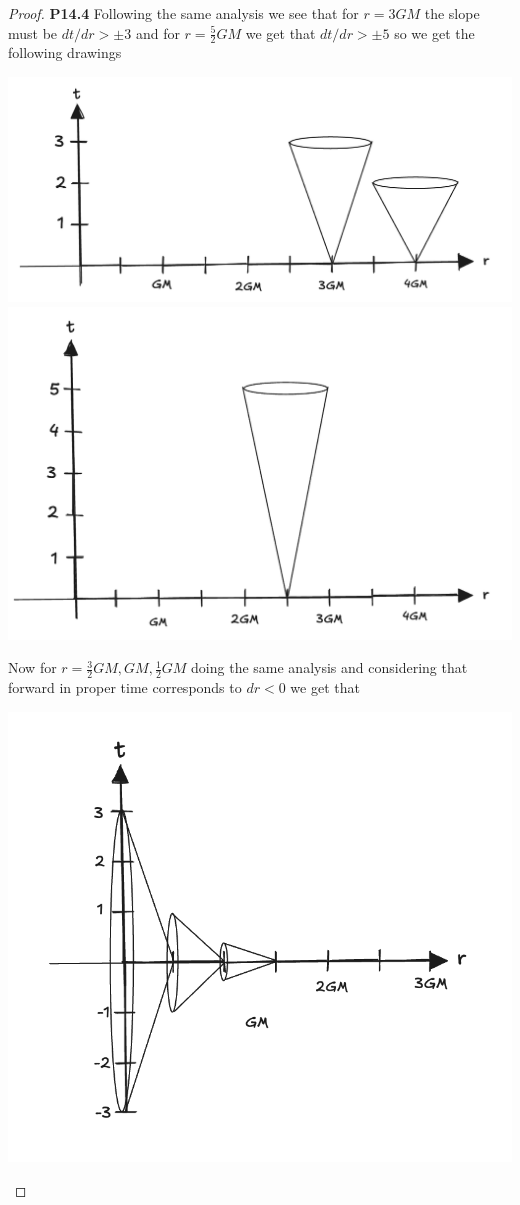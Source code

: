\documentclass[11pt]{article}
\theoremstyle{definition}
\begin{document}
\cleardoublepage
\begin{proof}{\textbf{P14.4}}
Following the same analysis we see that for $r = 3GM$ the slope must be
$dt/dr > \pm 3$ and for $r = \frac{5}{2}GM$ we get that $dt/dr > \pm 5$
so we get the following drawings
\begin{center}
    \includegraphics[scale=0.2]{ch14-p14.4-i.png}
    \includegraphics[scale=0.23]{ch14-p14.4-ii.png}
\end{center}
Now for $r = \frac{3}{2}GM, GM, \frac{1}{2}GM$ doing the same analysis and
considering that forward in proper time corresponds to $dr < 0$ we get that
 \begin{center}
    \includegraphics[scale=0.25]{ch14-p14.4-iii.png}

\end{center}
\end{proof}
\end{document}
